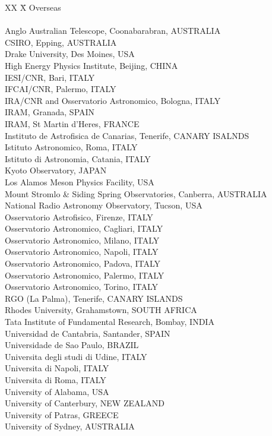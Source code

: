 \begin{tabbing}
XX \=X  Overseas\\
\\
\>Anglo Australian Telescope, Coonabarabran, AUSTRALIA\\
\>CSIRO, Epping, AUSTRALIA\\
\>Drake University, Des Moines, USA\\
\>High Energy Physics Institute, Beijing, CHINA\\
\>IESI/CNR, Bari, ITALY\\
\>IFCAI/CNR, Palermo, ITALY\\
\>IRA/CNR and Osservatorio Astronomico, Bologna, ITALY\\
\>IRAM, Granada, SPAIN\\
\>IRAM, St Martin d'Heres, FRANCE\\
\>Instituto de Astrofisica de Canarias, Tenerife, CANARY ISALNDS\\
\>Istituto Astronomico, Roma, ITALY\\
\>Istituto di Astronomia, Catania, ITALY\\
\>Kyoto Observatory, JAPAN\\
\>Los Alamos Meson Physics Facility, USA\\
\>Mount Stromlo \& Siding Spring Observatories, Canberra, AUSTRALIA\\
\>National Radio Astronomy Observatory, Tucson, USA\\
\>Osservatorio Astrofisico, Firenze, ITALY\\
\>Osservatorio Astronomico, Cagliari, ITALY\\
\>Osservatorio Astronomico, Milano, ITALY\\
\>Osservatorio Astronomico, Napoli, ITALY\\
\>Osservatorio Astronomico, Padova, ITALY\\
\>Osservatorio Astronomico, Palermo, ITALY\\
\>Osservatorio Astronomico, Torino, ITALY\\
\>RGO (La Palma), Tenerife, CANARY ISLANDS\\
\>Rhodes University, Grahamstown, SOUTH AFRICA\\
\>Tata Institute of Fundamental Research, Bombay, INDIA\\
\>Universidad de Cantabria, Santander, SPAIN\\
\>Universidade de Sao Paulo, BRAZIL\\
\>Universita degli studi di Udine, ITALY\\
\>Universita di Napoli, ITALY\\
\>Universita di Roma, ITALY\\
\>University of Alabama, USA\\
\>University of Canterbury, NEW ZEALAND\\
\>University of Patras, GREECE\\
\>University of Sydney, AUSTRALIA
\end{tabbing}

